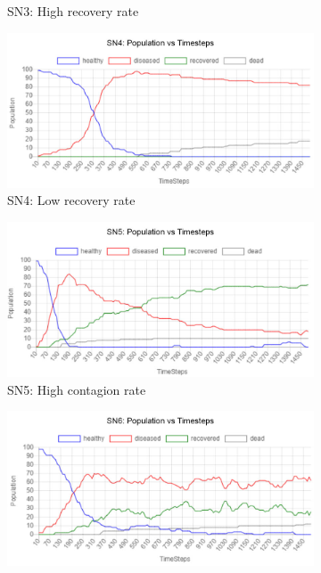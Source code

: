 \documentclass[a4paper,11pt]{article}
\begin{document}
\begin{figure}[H]
\begin{subfigure}[b]{0.49\linewidth}
            \caption{SN3:  High recovery rate}
            \label{fig:SN3}
        \end{subfigure}
        \begin{subfigure}[b]{0.49\linewidth}
            \includegraphics[width=\linewidth]{pop_graphs/SN4_pop.jpg}
            \caption{SN4:  Low recovery rate}
            \label{fig:SN4}
        \end{subfigure}
        \begin{subfigure}[b]{0.49\linewidth}
            \includegraphics[width=\linewidth]{pop_graphs/SN5_pop.jpg}
            \caption{SN5:  High contagion rate}
            \label{fig:SN5}
        \end{subfigure}
        \begin{subfigure}[b]{0.49\linewidth}
            \includegraphics[width=\linewidth]{pop_graphs/SN6_pop.jpg}

\end{subfigure}
\end{figure}
\end{document}
